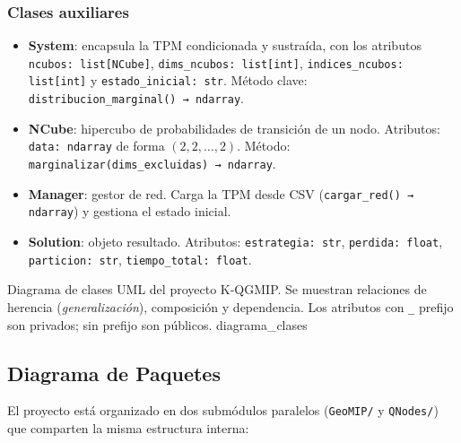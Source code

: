 \subsubsection*{Clases auxiliares}

\begin{itemize}
  \item \textbf{System}: encapsula la TPM condicionada y sustraída, con los
        atributos \texttt{ncubos: list[NCube]}, \texttt{dims\_ncubos: list[int]},
        \texttt{indices\_ncubos: list[int]} y \texttt{estado\_inicial: str}.
        Método clave: \texttt{distribucion\_marginal() → ndarray}.

  \item \textbf{NCube}: hipercubo de probabilidades de transición de un nodo.
        Atributos: \texttt{data: ndarray} de forma $(2, 2, \ldots, 2)$.
        Método: \texttt{marginalizar(dims\_excluidas) → ndarray}.

  \item \textbf{Manager}: gestor de red. Carga la TPM desde CSV
        (\texttt{cargar\_red() → ndarray}) y gestiona el estado inicial.

  \item \textbf{Solution}: objeto resultado. Atributos: \texttt{estrategia: str},
        \texttt{perdida: float}, \texttt{particion: str}, \texttt{tiempo\_total: float}.
\end{itemize}

%
  {Diagrama de clases UML del proyecto K-QGMIP. Se muestran relaciones de herencia
   (\textit{generalización}), composición y dependencia. Los atributos con \texttt{\_}
   prefijo son privados; sin prefijo son públicos.}%
  {diagrama_clases}

\subsection{Diagrama de Paquetes}

El proyecto está organizado en dos submódulos paralelos (\texttt{GeoMIP/} y
\texttt{QNodes/}) que comparten la misma estructura interna:

